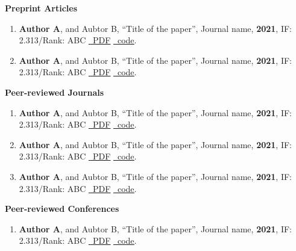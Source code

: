\normalsize{\textbf{Preprint Articles}}
\begin{enumerate}[leftmargin=*,nosep]
\item	\textbf{Author A}, and Aubtor B, “Title of the paper”, Journal name, \textbf{2021},	IF: 2.313/Rank: ABC \href{https://drive.google.com/file/d/}{\raisebox{-0.2\height}\  \underline{PDF}} \href{https://github.com/iamgmujtaba/}{\raisebox{-0.2\height}\  \underline{code}}.
\item	\textbf{Author A}, and Aubtor B, “Title of the paper”, Journal name, \textbf{2021},	IF: 2.313/Rank: ABC \href{https://drive.google.com/file/d/}{\raisebox{-0.2\height}\  \underline{PDF}} \href{https://github.com/iamgmujtaba/}{\raisebox{-0.2\height}\  \underline{code}}.
\end{enumerate}


\vspace*{7pt}

\normalsize{\textbf{Peer-reviewed Journals}}
\begin{enumerate}[leftmargin=*,nosep]
\item	\textbf{Author A}, and Aubtor B, “Title of the paper”, Journal name, \textbf{2021},	IF: 2.313/Rank: ABC \href{https://drive.google.com/file/d/}{\raisebox{-0.2\height}\  \underline{PDF}} \href{https://github.com/iamgmujtaba/}{\raisebox{-0.2\height}\  \underline{code}}.
\item	\textbf{Author A}, and Aubtor B, “Title of the paper”, Journal name, \textbf{2021},	IF: 2.313/Rank: ABC \href{https://drive.google.com/file/d/}{\raisebox{-0.2\height}\  \underline{PDF}} \href{https://github.com/iamgmujtaba/}{\raisebox{-0.2\height}\  \underline{code}}.
\item	\textbf{Author A}, and Aubtor B, “Title of the paper”, Journal name, \textbf{2021},	IF: 2.313/Rank: ABC \href{https://drive.google.com/file/d/}{\raisebox{-0.2\height}\  \underline{PDF}} \href{https://github.com/iamgmujtaba/}{\raisebox{-0.2\height}\  \underline{code}}.
\end{enumerate}

\vspace*{7pt}

\normalsize{\textbf{Peer-reviewed Conferences}}
\begin{enumerate}[leftmargin=*,nosep]
\item	\textbf{Author A}, and Aubtor B, “Title of the paper”, Journal name, \textbf{2021},	IF: 2.313/Rank: ABC \href{https://drive.google.com/file/d/}{\raisebox{-0.2\height}\  \underline{PDF}} \href{https://github.com/iamgmujtaba/}{\raisebox{-0.2\height}\  \underline{code}}.
\end{enumerate}


